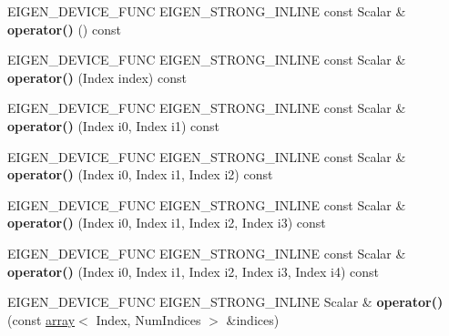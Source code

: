 \begin{DoxyCompactItemize}
\mbox{\label{class_eigen_1_1_tensor_map_a87d1135393db607c950c3f01832c7f93}} 
E\+I\+G\+E\+N\+\_\+\+D\+E\+V\+I\+C\+E\+\_\+\+F\+U\+NC E\+I\+G\+E\+N\+\_\+\+S\+T\+R\+O\+N\+G\+\_\+\+I\+N\+L\+I\+NE const Scalar \& {\bfseries operator()} () const
\item 
\mbox{\label{class_eigen_1_1_tensor_map_ae0881920d6de72e7d3a65300a0dd0316}} 
E\+I\+G\+E\+N\+\_\+\+D\+E\+V\+I\+C\+E\+\_\+\+F\+U\+NC E\+I\+G\+E\+N\+\_\+\+S\+T\+R\+O\+N\+G\+\_\+\+I\+N\+L\+I\+NE const Scalar \& {\bfseries operator()} (Index index) const
\item 
\mbox{\label{class_eigen_1_1_tensor_map_a38ebb1946f395db585b8ecef8939f534}} 
E\+I\+G\+E\+N\+\_\+\+D\+E\+V\+I\+C\+E\+\_\+\+F\+U\+NC E\+I\+G\+E\+N\+\_\+\+S\+T\+R\+O\+N\+G\+\_\+\+I\+N\+L\+I\+NE const Scalar \& {\bfseries operator()} (Index i0, Index i1) const
\item 
\mbox{\label{class_eigen_1_1_tensor_map_a3981b3e9ba734768f17e3aa9d92631f9}} 
E\+I\+G\+E\+N\+\_\+\+D\+E\+V\+I\+C\+E\+\_\+\+F\+U\+NC E\+I\+G\+E\+N\+\_\+\+S\+T\+R\+O\+N\+G\+\_\+\+I\+N\+L\+I\+NE const Scalar \& {\bfseries operator()} (Index i0, Index i1, Index i2) const
\item 
\mbox{\label{class_eigen_1_1_tensor_map_a11b53f82097abb9804acffd26fab9847}} 
E\+I\+G\+E\+N\+\_\+\+D\+E\+V\+I\+C\+E\+\_\+\+F\+U\+NC E\+I\+G\+E\+N\+\_\+\+S\+T\+R\+O\+N\+G\+\_\+\+I\+N\+L\+I\+NE const Scalar \& {\bfseries operator()} (Index i0, Index i1, Index i2, Index i3) const
\item 
\mbox{\label{class_eigen_1_1_tensor_map_a4e253a254b8b3b336749380d1698489c}} 
E\+I\+G\+E\+N\+\_\+\+D\+E\+V\+I\+C\+E\+\_\+\+F\+U\+NC E\+I\+G\+E\+N\+\_\+\+S\+T\+R\+O\+N\+G\+\_\+\+I\+N\+L\+I\+NE const Scalar \& {\bfseries operator()} (Index i0, Index i1, Index i2, Index i3, Index i4) const
\item 
\mbox{\label{class_eigen_1_1_tensor_map_a8276397330363b857fa84f0ddcdd5376}} 
E\+I\+G\+E\+N\+\_\+\+D\+E\+V\+I\+C\+E\+\_\+\+F\+U\+NC E\+I\+G\+E\+N\+\_\+\+S\+T\+R\+O\+N\+G\+\_\+\+I\+N\+L\+I\+NE Scalar \& {\bfseries operator()} (const \hyperlink{class_eigen_1_1array}{array}$<$ Index, Num\+Indices $>$ \&indices)

\end{DoxyCompactItemize}
